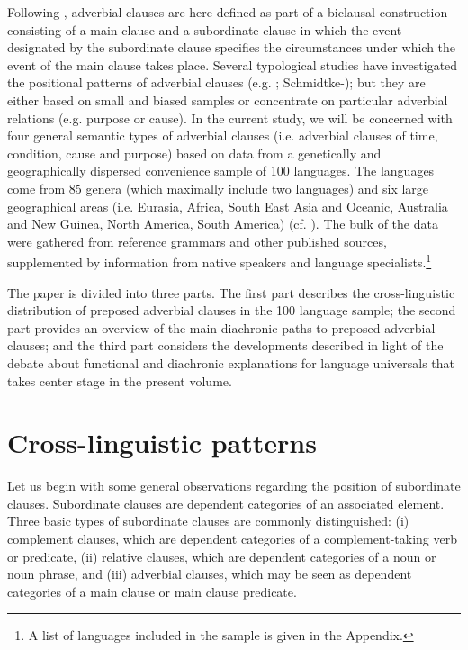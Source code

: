 \documentclass[output=paper]{langsci/langscibook}
\begin{document}
Following \citet{Cristofaro2003}, adverbial clauses are here defined as part of a biclausal construction consisting of a main clause and a subordinate clause in which the event designated by the subordinate clause specifies the circumstances under which the event of the main clause takes place. Several typological studies have investigated the positional patterns of adverbial clauses (e.g. \citealt{Greenberg1963,Diessel2001}; Schmidtke-\citealt{Bode2009,DiesselHetterle2011,Hetterle2015}); but they are either based on small and biased samples or concentrate on particular adverbial relations (e.g. purpose or cause). In the current study, we will be concerned with four general semantic types of adverbial clauses (i.e. adverbial clauses of time, condition, cause and purpose) based on data from a genetically and geographically dispersed convenience sample of 100 languages. The languages come from 85 genera (which maximally include two languages) and six large geographical areas (i.e. Eurasia, Africa, South East Asia and Oceanic, Australia and New Guinea, North America, South America) (cf. \citealt{Dryer1992}). The bulk of the data were gathered from reference grammars and other published sources, supplemented by information from native speakers and language specialists.\footnote{A list of languages included in the sample is given in the Appendix.} 

The paper is divided into three parts. The first part describes the cross-linguistic distribution of preposed adverbial clauses in the 100 language sample; the second part provides an overview of the main diachronic paths to preposed adverbial clauses; and the third part considers the developments described in light of the debate about functional and diachronic explanations for language universals that takes center stage in the present volume.

\section{Cross-linguistic patterns}

Let us begin with some general observations regarding the position of subordinate clauses. Subordinate clauses are dependent categories of an associated element. Three basic types of subordinate clauses are commonly distinguished: 
(i) complement clauses, which are dependent categories of a complement-taking verb or predicate, 
(ii) relative clauses, which are dependent categories of a noun or noun phrase, and 
(iii) adverbial clauses, which may be seen as dependent categories of a main clause or main clause predicate. 
\end{document}
